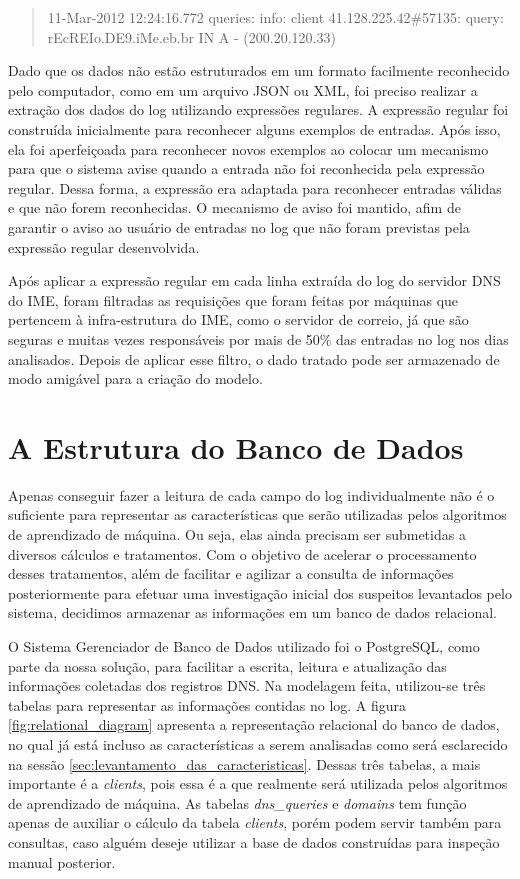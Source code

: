 \begin{quote}
11-Mar-2012 12:24:16.772 queries: info: client 41.128.225.42\#57135: query: rEcREIo.DE9.iMe.eb.br IN A - (200.20.120.33)
\end{quote}

Dado que os dados não estão estruturados em um formato facilmente reconhecido pelo computador, como em um arquivo JSON ou XML, foi preciso realizar a extração dos dados do log utilizando expressões regulares. A expressão regular foi construída inicialmente para reconhecer alguns exemplos de entradas. Após isso, ela foi aperfeiçoada para reconhecer novos exemplos ao colocar um mecanismo para que o sistema avise quando a entrada não foi reconhecida pela expressão regular. Dessa forma, a expressão era adaptada para reconhecer entradas válidas e que não forem reconhecidas. O mecanismo de aviso foi mantido, afim de garantir o aviso ao usuário de entradas no log que não foram previstas pela expressão regular desenvolvida.

Após aplicar a expressão regular em cada linha extraída do log do servidor DNS do IME, foram filtradas as requisições que foram feitas por máquinas que pertencem à infra-estrutura do IME, como o servidor de correio, já que são seguras e muitas vezes responsáveis por mais de 50\% das entradas no log nos dias analisados. Depois de aplicar esse filtro, o dado tratado pode ser armazenado de modo amigável para a criação do modelo.

\section{A Estrutura do Banco de Dados}
Apenas conseguir fazer a leitura de cada campo do log individualmente não é o suficiente para representar as características que serão utilizadas pelos algoritmos de aprendizado de máquina. Ou seja, elas ainda precisam ser submetidas a diversos cálculos e tratamentos. Com o objetivo de acelerar o processamento desses tratamentos, além de facilitar e agilizar a consulta de informações posteriormente para efetuar uma investigação inicial dos suspeitos levantados pelo sistema, decidimos armazenar as informações em um banco de dados relacional.

O Sistema Gerenciador de Banco de Dados utilizado foi o PostgreSQL, como parte da nossa solução, para facilitar a escrita, leitura e atualização das informações coletadas dos registros DNS. Na modelagem feita, utilizou-se três tabelas para representar as informações contidas no log. A figura \ref{fig:relational_diagram} apresenta a representação relacional do banco de dados, no qual já está incluso as características a serem analisadas como será esclarecido na sessão \ref{sec:levantamento_das_caracteristicas}. Dessas três tabelas, a mais importante é a \textit{clients}, pois essa é a que realmente será utilizada pelos algoritmos de aprendizado de máquina. As tabelas \textit{dns\_queries} e \textit{domains} tem função apenas de auxiliar o cálculo da tabela \textit{clients}, porém podem servir também para consultas, caso alguém deseje utilizar a base de dados construídas para inspeção manual posterior.

